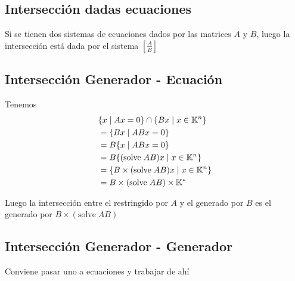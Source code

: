\documentclass{article}
\begin{document}
\subsection{Intersección dadas ecuaciones}
Si se tienen dos sistemas de ecuaciones dados por las matrices $A$ y $B$, luego
la intersección está dada por el sistema $
\left[\frac{A}{B}\right]
$

\subsection{Intersección Generador - Ecuación}
Tenemos
\begin{align*}
& \{x \mid Ax = 0\} \cap \{Bx \mid x \in \mathbb{K}^n\} \\
&= \{Bx \mid ABx = 0\} \\
&= B \{x \mid ABx = 0\} \\
&= B \{(\text{solve}\; AB)x \mid x \in \mathbb{K}^n\} \\
&= \{B\times(\text{solve}\; AB)x \mid x \in \mathbb{K}^n\} \\
&= B\times(\text{solve}\; AB) \times \mathbb{K}^*
\end{align*}

Luego la intersección entre el restringido por $A$ y el generado por $B$
es el generado por $B \times (\text{solve}\; AB)$

\subsection{Intersección Generador - Generador}
Conviene pasar uno a ecuaciones y trabajar de ahí
\end{document}
